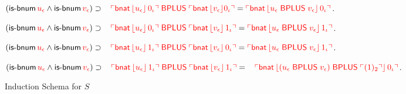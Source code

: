 \documentclass[fleqn]{llncs}
\begin{document}
\begin{biformthy}
    \item $(\mbox{\sf is-bnum} \, \textcolor{red}{u_\epsilon} \wedge \mbox{\sf is-bnum}
      \, \textcolor{red}{v_\epsilon}) \supset {}\\
        \hspace*{2ex} \textcolor{red}{\ulcorner\mbox{\sf bnat} \,
            \lfloor u_\epsilon\rfloor \, 0_\iota\urcorner \; \mbox{\sf BPLUS} \;
          \ulcorner\mbox{\sf bnat} \, \lfloor v_\epsilon\rfloor 0_\iota\urcorner} =
        \textcolor{red}{\ulcorner\mbox{\sf bnat} \, \lfloor u_\epsilon \;
              \mbox{\sf BPLUS} \; v_\epsilon\rfloor \, 0_\iota\urcorner}$.

    \item $(\mbox{\sf is-bnum} \, \textcolor{red}{u_\epsilon} \wedge \mbox{\sf is-bnum}
      \, \textcolor{red}{v_\epsilon}) \supset {}\\
        \hspace*{2ex} \textcolor{red}{\ulcorner\mbox{\sf bnat} \,
            \lfloor u_\epsilon\rfloor \, 0_\iota\urcorner \; \mbox{\sf BPLUS} \;
          \ulcorner\mbox{\sf bnat} \, \lfloor v_\epsilon\rfloor \, 1_\iota\urcorner} =
        \textcolor{red}{\ulcorner\mbox{\sf bnat} \, \lfloor u_\epsilon \;
              \mbox{\sf BPLUS} \; v_\epsilon\rfloor \, 1_\iota\urcorner}$.

    \item $(\mbox{\sf is-bnum} \, \textcolor{red}{u_\epsilon} \wedge \mbox{\sf is-bnum}
      \, \textcolor{red}{v_\epsilon}) \supset {}\\
        \hspace*{2ex} \textcolor{red}{\ulcorner\mbox{\sf bnat} \,
            \lfloor u_\epsilon\rfloor \, 1_\iota\urcorner \; \mbox{\sf BPLUS} \;
          \ulcorner\mbox{\sf bnat} \, \lfloor v_\epsilon\rfloor \, 0_\iota\urcorner} =
        \textcolor{red}{\ulcorner\mbox{\sf bnat} \, \lfloor u_\epsilon \;
              \mbox{\sf BPLUS} \; v_\epsilon\rfloor \, 1_\iota\urcorner}$.
    \fi

    \setcounter{enumi}{14}

    \item $(\mbox{\sf is-bnum} \, \textcolor{red}{u_\epsilon} \wedge \mbox{\sf is-bnum}
      \, \textcolor{red}{v_\epsilon}) \supset {}\\
        \hspace*{2ex} \textcolor{red}{\ulcorner\mbox{\sf bnat} \,
            \lfloor u_\epsilon\rfloor \, 1_\iota\urcorner \; \mbox{\sf BPLUS} \;
          \ulcorner\mbox{\sf bnat} \, \lfloor v_\epsilon\rfloor \, 1_\iota\urcorner} = {}\\
        \hspace*{2ex}\textcolor{red}{\ulcorner\mbox{\sf bnat} \,
            \lfloor(u_\epsilon \; \mbox{\sf BPLUS} \; v_\epsilon)
              \; \mbox{\sf BPLUS} \; \ulcorner(1)_2\urcorner\rfloor \, 0_\iota\urcorner}$.

    \iffalse
    \item Induction Schema for $S$


\end{biformthy}
\end{document}
